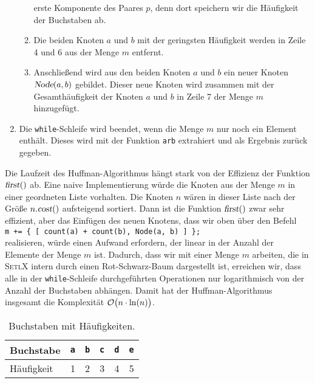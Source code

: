 \begin{enumerate}
\begin{enumerate}
            erste Komponente des Paares $p$, denn dort speichern wir die H\"aufigkeit der Buchstaben 
            ab.
      \item Die beiden Knoten $a$ und $b$ mit der geringsten H\"aufigkeit werden in Zeile 4 und 6
            aus der Menge $m$ entfernt.
      \item Anschlie{\ss}end wird aus den beiden Knoten $a$ und $b$ ein neuer Knoten 
            $\textsl{Node}(a,b)$ gebildet.
            Dieser neue Knoten wird zusammen mit der Gesamth\"aufigkeit der Knoten $a$ und $b$ in Zeile
            7 der Menge $m$ hinzugef\"ugt.
      \end{enumerate}
\item Die \texttt{while}-Schleife wird beendet, wenn die Menge $m$ nur noch ein Element enth\"alt.
      Dieses wird mit der Funktion \texttt{arb} extrahiert und als Ergebnis zur\"uck gegeben.
\end{enumerate}
Die Laufzeit des Huffman-Algorithmus h\"angt stark von der Effizienz der Funktion $\textsl{first}()$ ab.
Eine naive Implementierung w\"urde die Knoten aus der Menge $m$ in einer geordneten Liste vorhalten.
Die Knoten $n$ w\"aren in dieser Liste nach der Gr\"o{\ss}e $n.\textsl{cost}()$ aufsteigend sortiert.
Dann ist die Funktion $\textsl{first}()$ zwar sehr effizient, aber das Einf\"ugen des neuen Knotens,
dass wir oben \"uber den Befehl 
\\[0.2cm]
\hspace*{1.3cm}
\texttt{m += \{ [ count(a) + count(b), Node(a, b) ] \};}
\\[0.2cm]
realisieren,  w\"urde einen Aufwand erfordern, der linear in der Anzahl der Elemente der Menge $m$ ist.
Dadurch, dass wir mit einer Menge  $m$ arbeiten, die in \textsc{SetlX} intern durch einen
Rot-Schwarz-Baum dargestellt ist, erreichen wir, dass alle in der \texttt{while}-Schleife durchgef\"uhrten
Operationen nur logarithmisch von der Anzahl der Buchstaben abh\"angen.  Damit hat der Huffman-Algorithmus
insgesamt die Komplexit\"at $\mathcal{O}\bigl(n \cdot \ln(n)\bigr)$.
 

\begin{table}[htbp]
  \centering
\begin{tabular}[t]{|l|r|r|r|r|r|}
\hline
Buchstabe  & \texttt{a} & \texttt{b} & \texttt{c} & \texttt{d} & \texttt{e} \\
\hline
\hline
H\"aufigkeit &          1 &          2 &          3 &          4 &          5 \\
\hline
\end{tabular}
  \caption{Buchstaben mit H\"aufigkeiten.}
  \label{tab:frequency}
\end{table}


